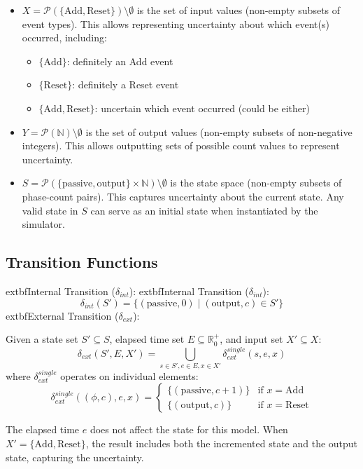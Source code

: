 \begin{itemize}
    \item $X = \mathcal{P}(\{\text{Add}, \text{Reset}\}) \setminus \emptyset$ is the set of input values (non-empty subsets of event types). This allows representing uncertainty about which event(s) occurred, including:
    \begin{itemize}
        \item $\{\text{Add}\}$: definitely an Add event
        \item $\{\text{Reset}\}$: definitely a Reset event
        \item $\{\text{Add}, \text{Reset}\}$: uncertain which event occurred (could be either)
    \end{itemize}
    \item $Y = \mathcal{P}(\mathbb{N}) \setminus \emptyset$ is the set of output values (non-empty subsets of non-negative integers). This allows outputting sets of possible count values to represent uncertainty.
    \item $S = \mathcal{P}(\{\text{passive}, \text{output}\} \times \mathbb{N}) \setminus \emptyset$ is the state space (non-empty subsets of phase-count pairs). This captures uncertainty about the current state. Any valid state in $S$ can serve as an initial state when instantiated by the simulator.
\end{itemize}

\subsection{Transition Functions}

	extbf{Internal Transition ($\delta_{int}$):}
	extbf{Internal Transition ($\delta_{int}$):}
\[
\delta_{int}(S') = \{(\text{passive}, 0) \mid (\text{output}, c) \in S'\}
\]
    extbf{External Transition ($\delta_{ext}$):}

Given a state set $S' \subseteq S$, elapsed time set $E \subseteq \mathbb{R}^+_0$, and input set $X' \subseteq X$:
\[
\delta_{ext}(S', E, X') = \bigcup_{s \in S', e \in E, x \in X'} \delta_{ext}^{single}(s, e, x)
\]
where $\delta_{ext}^{single}$ operates on individual elements:
\[
\delta_{ext}^{single}((\phi, c), e, x) = 
\begin{cases}
    \{(\text{passive}, c + 1)\} & \text{if } x = \text{Add} \\
    \{(\text{output}, c)\} & \text{if } x = \text{Reset}
\end{cases}
\]

The elapsed time $e$ does not affect the state for this model. When $X' = \{\text{Add}, \text{Reset}\}$, the result includes both the incremented state and the output state, capturing the uncertainty.

